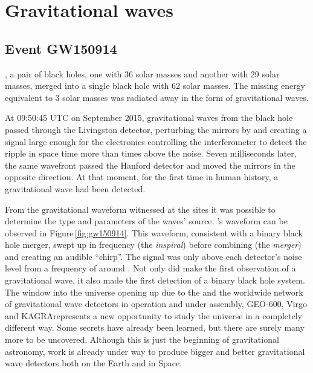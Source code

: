 \chapter{\label{c:gw-detection}Gravitational waves}

\section{Event GW150914}
, a pair of black holes, one with \num{36} solar masses and another with \num{29} solar masses, merged into a single black hole with \num{62} solar masses. The missing energy equivalent to \num{3} solar masses was radiated away in the form of gravitational waves.

At 09:50:45 \gls{UTC} on  September 2015, gravitational waves from the black hole passed through the \LIGO{} Livingston detector, perturbing the mirrors by  and creating a signal large enough for the electronics controlling the interferometer to detect the ripple in space time more than  times above the noise. Seven milliseconds later, the same wavefront passed the \LIGO{} Hanford detector and moved the mirrors in the opposite direction. At that moment, for the first time in human history, a gravitational wave had been detected.

From the gravitational waveform witnessed at the \LIGO{} sites it was possible to determine the type and parameters of the waves' source. \emph{\GWFIRSTEVENT{}}'s waveform can be observed in Figure\,\ref{fig:gw150914}. This waveform, consistent with a binary black hole merger, swept up in frequency (the \emph{inspiral}) before combining (the \emph{merger}) and creating an audible ``chirp''. The signal was only above each detector's noise level from a frequency of around . Not only did \LIGO{} make the first observation of a gravitational wave, it also made the first detection of a binary black hole system. The window into the universe opening up due to the \LIGO{}\textemdash and the worldwide network of gravitational wave detectors in operation and under assembly, GEO-600, Virgo and KAGRA\textemdash represents a new opportunity to study the universe in a completely different way. Some secrets have already been learned, but there are surely many more to be uncovered. Although this is just the beginning of gravitational astronomy, work is already under way to produce bigger and better gravitational wave detectors both on the Earth and in Space.

